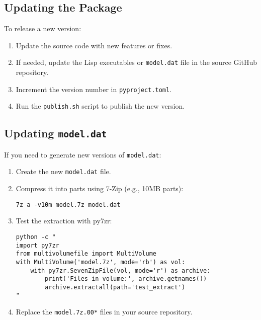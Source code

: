 \documentclass[11pt, a4paper]{article}
\begin{document}
\subsection{Updating the Package}
To release a new version:
\begin{enumerate}
    \item Update the source code with new features or fixes.
    \item If needed, update the Lisp executables or \texttt{model.dat} file in the source GitHub repository.
    \item Increment the version number in \texttt{pyproject.toml}.
    \item Run the \texttt{publish.sh} script to publish the new version.
\end{enumerate}

\subsection{Updating \texttt{model.dat}}
If you need to generate new versions of \texttt{model.dat}:
\begin{enumerate}
    \item Create the new \texttt{model.dat} file.
    \item Compress it into parts using 7-Zip (e.g., 10MB parts):
    \begin{lstlisting}[style=bashstyle]
7z a -v10m model.7z model.dat
    \end{lstlisting}
    \item Test the extraction with py7zr:
    \begin{lstlisting}[style=bashstyle]
python -c "
import py7zr
from multivolumefile import MultiVolume
with MultiVolume('model.7z', mode='rb') as vol:
    with py7zr.SevenZipFile(vol, mode='r') as archive:
        print('Files in volume:', archive.getnames())
        archive.extractall(path='test_extract')
"
    \end{lstlisting}
    \item Replace the \texttt{model.7z.00*} files in your source repository.
\end{enumerate}
\end{document}
